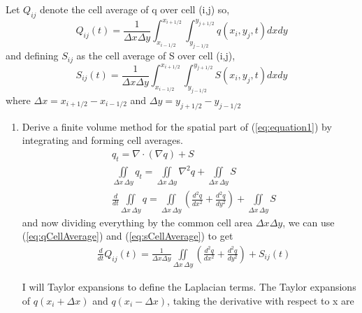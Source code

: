 Let $Q_{ij}$ denote the cell average of q over cell (i,j) so, 
\begin{equation}
	Q_{ij}(t) = \frac{1}{\Delta x \Delta y} \int_{x_{i-1/2}}^{x_{i+1/2}}\int_{y_{j-1/2}}^{y_{j+1/2}} q(x_i,y_j,t) dxdy \label{eq:qCellAverage} 
\end{equation}
and defining $S_{ij}$ as the cell average of S over cell (i,j), 
\begin{equation}
	S_{ij}(t) = \frac{1}{\Delta x \Delta y} \int_{x_{i-1/2}}^{x_{i+1/2}}\int_{y_{j-1/2}}^{y_{j+1/2}} S(x_i,y_j,t) dxdy \label{eq:sCellAverage} 
\end{equation}
where $\Delta x = x_{i+1/2}-x_{i-1/2}$ and $\Delta y = y_{j+1/2}-y_{j-1/2}$ 
\begin{enumerate}
	\item Derive a finite volume method for the spatial part of (\ref{eq:equation1}) by integrating and forming cell averages. 
	\begin{align*}
		& q_t = \nabla \cdot (\nabla q) + S \\
		& \iint \limits_{\Delta x \, \Delta y} q_t = \iint \limits_{\Delta x \, \Delta y} \nabla^2 q + \iint \limits_{\Delta x \, \Delta y} S \\
		& \frac{d}{dt} \iint \limits_{\Delta x \, \Delta y} q = \iint \limits_{\Delta x \, \Delta y} \left( \frac{d^2 q}{dx^2} + \frac{d^2 q}{dy^2} \right) + \iint \limits_{\Delta x \, \Delta y} S 
	\end{align*}
	and now dividing everything by the common cell area $\Delta x \Delta y$, we can use (\ref{eq:qCellAverage}) and (\ref{eq:sCellAverage}) to get 
	\begin{align}
		& \frac{d}{dt} Q_{ij}(t) = \frac{1}{\Delta x \Delta y}\iint \limits_{\Delta x \, \Delta y} \left( \frac{d^2 q}{dx^2} + \frac{d^2 q}{dy^2} \right) + S_{ij}(t) \label{eq:eqCommon} 
	\end{align}
	
	I will Taylor expansions to define the Laplacian terms. The Taylor expansions of $q(x_i+\Delta x)$ and $q(x_i-\Delta x)$, taking the derivative with respect to x are
	

\end{enumerate}
